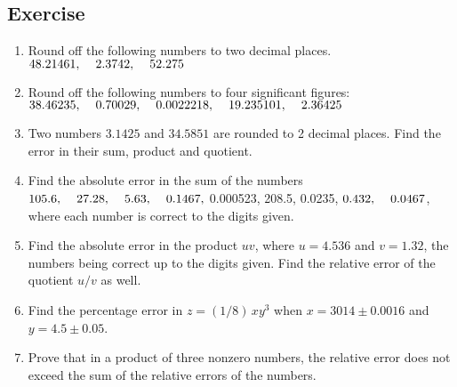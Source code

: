 \documentclass[aima203_lecturenotes_ku.tex]{subfiles}
\begin{document}
\subsection{Exercise}
\begin{enumerate}
\item Round off the following numbers to two decimal places. \\
  \(48.21461, \hspace{4mm} 2.3742, \hspace{4mm} 52.275 \)

\item  Round off the following numbers to four significant figures: \\
  \(38.46235, \hspace{4mm} 0.70029, \hspace{4mm} 0.0022218, \hspace{4mm} 19.235101, \hspace{4mm} 2.36425\)

\item Two numbers \(3.1425\) and \(34.5851\) are rounded to 2 decimal places. Find the error in their sum, product and quotient.

\item Find the absolute error in the sum of the numbers \(105.6, \hspace{4mm} 27.28, \hspace{4mm} 5.63, \hspace{4mm} 0.1467, \)  \hspace{4mm} 0.000523, \hspace{4mm} 208.5, \hspace{4mm} 0.0235, \hspace{4mm} \(0.432, \hspace{4mm} 0.0467\), where each number is correct to the digits given.

\item Find the absolute error in the product $uv$, where $u=4.536$ and $v=1.32$, the numbers being correct up to the digits given. Find the relative error of the quotient $u/v$ as well.

\item Find the percentage error in $z=(1/8)\, xy^3$ when $x=3014 \pm 0.0016$ and $y=4.5 \pm 0.05$.
\item Prove that in a product of three nonzero numbers, the relative error does not exceed the sum of the relative errors of the numbers.
\end{enumerate}
\end{document}
